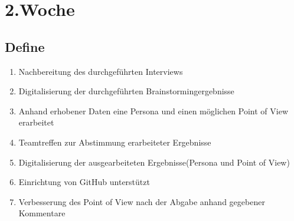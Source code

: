 \chapter{2.\hspace{0.5em}Woche}\label{wo2}

\section{Define}\label{wo2_1}

\begin{enumerate}[label={\Roman*)}]
	\item Nachbereitung des durchgef\"uhrten Interviews
	\item Digitalisierung der durchgef\"uhrten Brainstormingergebnisse
	\item Anhand erhobener Daten eine Persona und einen m\"oglichen Point of View erarbeitet
	\item Teamtreffen zur Abstimmung erarbeiteter Ergebnisse
	\item Digitalisierung der ausgearbeiteten Ergebnisse(Persona und Point of View)
	\item Einrichtung von GitHub unterst\"utzt
	\item Verbesserung des Point of View nach der Abgabe anhand gegebener Kommentare
\end{enumerate}